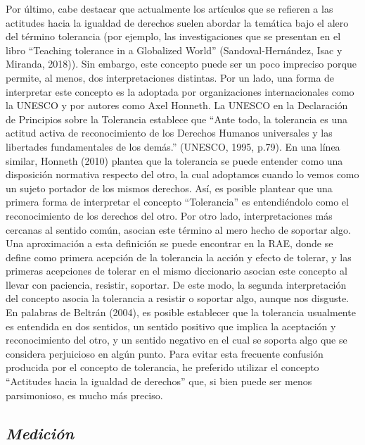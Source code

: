 \documentclass[12pt,twoside]{templates/facsothesis}
\begin{document}
Por último, cabe destacar que actualmente los artículos que se refieren a las actitudes hacia la igualdad de derechos suelen abordar la temática bajo el alero del término tolerancia (por ejemplo, las investigaciones que se presentan en el libro ``Teaching tolerance in a Globalized World'' (Sandoval-Hernández, Isac y Miranda, 2018)). Sin embargo, este concepto puede ser un poco impreciso porque permite, al menos, dos interpretaciones distintas. Por un lado, una forma de interpretar este concepto es la adoptada por organizaciones internacionales como la UNESCO y por autores como Axel Honneth. La UNESCO en la Declaración de Principios sobre la Tolerancia establece que ``Ante todo, la tolerancia es una actitud activa de reconocimiento de los Derechos Humanos universales y las libertades fundamentales de los demás.'' (UNESCO, 1995, p.79). En una línea similar, Honneth (2010) plantea que la tolerancia se puede entender como una disposición normativa respecto del otro, la cual adoptamos cuando lo vemos como un sujeto portador de los mismos derechos. Así, es posible plantear que una primera forma de interpretar el concepto ``Tolerancia'' es entendiéndolo como el reconocimiento de los derechos del otro. Por otro lado, interpretaciones más cercanas al sentido común, asocian este término al mero hecho de soportar algo. Una aproximación a esta definición se puede encontrar en la RAE, donde se define como primera acepción de la tolerancia la acción y efecto de tolerar, y las primeras acepciones de tolerar en el mismo diccionario asocian este concepto al llevar con paciencia, resistir, soportar. De este modo, la segunda interpretación del concepto asocia la tolerancia a resistir o soportar algo, aunque nos disguste. En palabras de Beltrán (2004), es posible establecer que la tolerancia usualmente es entendida en dos sentidos, un sentido positivo que implica la aceptación y reconocimiento del otro, y un sentido negativo en el cual se soporta algo que se considera perjuicioso en algún punto. Para evitar esta frecuente confusión producida por el concepto de tolerancia, he preferido utilizar el concepto ``Actitudes hacia la igualdad de derechos'' que, si bien puede ser menos parsimonioso, es mucho más preciso.

\hypertarget{mediciuxf3n}{%
\subsection{\texorpdfstring{\emph{Medición}}{Medición}}\label{mediciuxf3n}}
\end{document}
